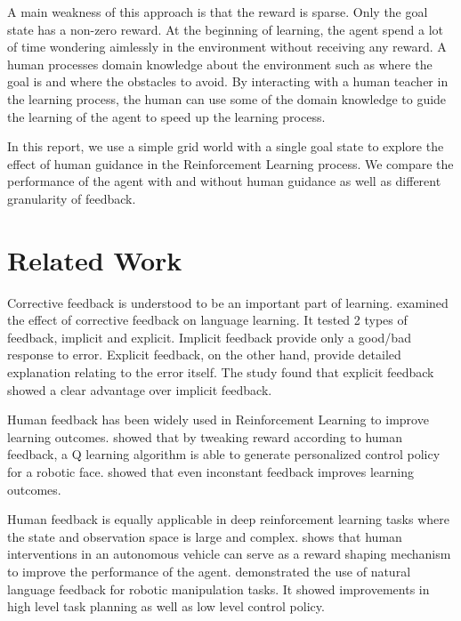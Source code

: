 \documentclass[conference]{IEEEtran}
\begin{document}
A main weakness of this approach is that the reward is sparse. Only the goal state has a non-zero reward. At the beginning of learning, the agent spend a lot of time wondering aimlessly in the environment without receiving any reward. A human processes domain knowledge about the environment such as where the goal is and where the obstacles to avoid. By interacting with a human teacher in the learning process, the human can use some of the domain knowledge to guide the learning of the agent to speed up the learning process.

In this report, we use a simple grid world with a single goal state to explore the effect of human guidance in the Reinforcement Learning process. We compare the performance of the agent with and without human guidance as well as different granularity of feedback.

\section{Related Work}

Corrective feedback is understood to be an important part of learning. \cite{ellisIMPLICITEXPLICITCORRECTIVE2006} examined the effect of corrective feedback on language learning. It tested 2 types of feedback, implicit and explicit. Implicit feedback provide only a good/bad response to error. Explicit feedback, on the other hand, provide detailed explanation relating to the error itself. The study found that explicit feedback showed a clear advantage over implicit feedback.

Human feedback has been widely used in Reinforcement Learning \cite{liHumanCenteredReinforcementLearning2019} to improve learning outcomes. \cite{iidaGeneratingPersonalityCharacter1998} showed that by tweaking reward according to human feedback, a Q learning algorithm is able to generate personalized control policy for a robotic face. \cite{tenorio-gonzalezDynamicRewardShaping2010} showed that even inconstant feedback improves learning outcomes.

Human feedback is equally applicable in deep reinforcement learning tasks where the state and observation space is large and complex. \cite{j.wuHumanGuidedReinforcementLearning2023} shows that human interventions in an autonomous vehicle can serve as a reward shaping mechanism to improve the performance of the agent. \cite{zhaDistillingRetrievingGeneralizable2024} demonstrated the use of natural language feedback for robotic manipulation tasks. It showed improvements in high level task planning as well as low level control policy.
\end{document}
